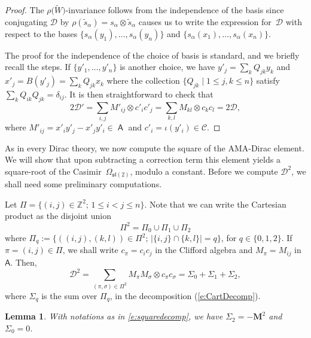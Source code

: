 \documentclass[pdftex]{sigma}
\numberwithin{equation}{section}
\newtheorem{Lemma}[Theorem]{Lemma}
\newcommand{\Cc}{\mathcal{C}}
\DeclareMathOperator{\ama}{\mathsf{A}}
\begin{document}
\begin{proof}
The $\rho\big(\tilde W\big)$-invariance follows from the independence of the basis since conjugating $\mathcal{D}$ by $\rho(\tilde{s}_\alpha) = s_\alpha\otimes\tilde{s}_\alpha$ causes us to write the expression for~$\mathcal{D}$ with respect to the bases $\{s_\alpha(y_1),\dots,s_\alpha(y_n)\}$ and $\{s_\alpha(x_1),\dots,s_\alpha(x_n)\}$.

The proof for the independence of the choice of basis is standard, and we briefly recall the steps. If $\{y'_1,\dots,y'_n\}$ is another choice, we have $y'_j = \sum_k Q_{jk}y_k$ and $x'_j = B(y'_j) = \sum_k Q_{jk}x_k$ where the collection $\{Q_{jk}\mid 1\leq j,k \leq n\}$ satisfy $\sum_k Q_{ik}Q_{jk} = \delta_{ij}$. It is then straightforward to check that
\[
2\mathcal{D}' = \sum_{i,j}M'_{ij}\otimes c'_ic'_j = \sum_{k,l}M_{kl}\otimes c_kc_l = 2\mathcal{D},
\]
where $M'_{ij} = x'_iy'_j - x'_jy'_i \in \ama$ and $c'_i=\iota(y'_i)\in\Cc$.
\end{proof}

As in every Dirac theory, we now compute the square of the AMA-Dirac element. We will show that upon subtracting a correction term this element yields a square-root of the Casimir~$\Omega_{\mathfrak{sl}(2)}$, modulo a constant. Before we compute $\mathcal{D}^2$, we shall need some preliminary computations.

Let $\Pi = \big\{(i,j)\in \mathbb{Z}^2;\, 1\leq i<j\leq n\big\}$. Note that we can write the Cartesian product as the disjoint union
\begin{equation}\label{e:CartDecomp}
\Pi^2 = \Pi_0 \cup \Pi_1 \cup \Pi_2
\end{equation}
where $\Pi_q := \big\{((i,j),(k,l))\in\Pi^2;\, |\{i,j\}\cap\{k,l\}|=q \big\}$, for $q \in \{0,1,2\}$. If $\pi = (i,j) \in \Pi$, we shall write $c_\pi = c_ic_j$ in the Clifford algebra and $M_\pi = M_{ij}$ in $\mathsf{A}$. Then,
\begin{equation}\label{e:squaredecomp}
\mathcal{D}^2 = \sum_{(\pi,\sigma) \in \Pi^2 } M_\pi M_\sigma \otimes c_\pi c_\sigma = \Sigma_0 + \Sigma_1 + \Sigma_2,
\end{equation}
where $\Sigma_q$ is the sum over $\Pi_q$, in the decomposition (\ref{e:CartDecomp}).

\begin{Lemma}
With notations as in \eqref{e:squaredecomp}, we have $\Sigma_2 = -\mathbf{M}^2$ and $\Sigma_0 = 0$.
\end{Lemma}
\end{document}
